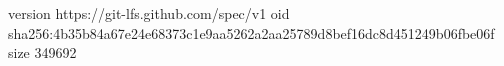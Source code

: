 version https://git-lfs.github.com/spec/v1
oid sha256:4b35b84a67e24e68373c1e9aa5262a2aa25789d8bef16dc8d451249b06fbe06f
size 349692
